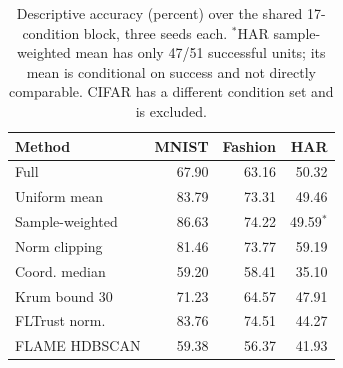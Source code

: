 \begin{table}[!t]
\centering\footnotesize
\caption{Descriptive accuracy (percent) over the shared 17-condition block, three seeds each. $^{*}$HAR sample-weighted mean has only 47/51 successful units; its mean is conditional on success and not directly comparable. CIFAR has a different condition set and is excluded.}\label{tab:accuracy}
\begin{tabular}{lrrr}
\toprule
Method & MNIST & Fashion & HAR \\
\midrule
Full & 67.90 & 63.16 & 50.32 \\
Uniform mean & 83.79 & 73.31 & 49.46 \\
Sample-weighted & 86.63 & 74.22 & 49.59$^{*}$ \\
Norm clipping & 81.46 & 73.77 & 59.19 \\
Coord. median & 59.20 & 58.41 & 35.10 \\
Krum bound 30 & 71.23 & 64.57 & 47.91 \\
FLTrust norm. & 83.76 & 74.51 & 44.27 \\
FLAME HDBSCAN & 59.38 & 56.37 & 41.93 \\
\bottomrule
\end{tabular}
\end{table}
